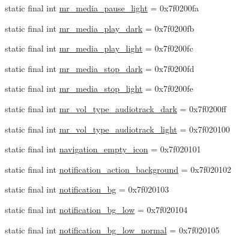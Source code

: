 \begin{CompactItemize}
\item 
static final int \hyperlink{classandroid_1_1support_1_1v7_1_1mediarouter_1_1_r_1_1drawable_a862bad169cc7f219382a1fb810b7ad2}{mr\_\-media\_\-pause\_\-light} = 0x7f0200fa
\item 
static final int \hyperlink{classandroid_1_1support_1_1v7_1_1mediarouter_1_1_r_1_1drawable_e07830f524b3a323dcf5b491b8f82373}{mr\_\-media\_\-play\_\-dark} = 0x7f0200fb
\item 
static final int \hyperlink{classandroid_1_1support_1_1v7_1_1mediarouter_1_1_r_1_1drawable_a74d65532be2843be8daeba8e2464195}{mr\_\-media\_\-play\_\-light} = 0x7f0200fc
\item 
static final int \hyperlink{classandroid_1_1support_1_1v7_1_1mediarouter_1_1_r_1_1drawable_57a217e83adb7064e74ad314307c20f0}{mr\_\-media\_\-stop\_\-dark} = 0x7f0200fd
\item 
static final int \hyperlink{classandroid_1_1support_1_1v7_1_1mediarouter_1_1_r_1_1drawable_2f5a8170570a1387b03bc94129044086}{mr\_\-media\_\-stop\_\-light} = 0x7f0200fe
\item 
static final int \hyperlink{classandroid_1_1support_1_1v7_1_1mediarouter_1_1_r_1_1drawable_5a975d505da767f0098f84cab8593617}{mr\_\-vol\_\-type\_\-audiotrack\_\-dark} = 0x7f0200ff
\item 
static final int \hyperlink{classandroid_1_1support_1_1v7_1_1mediarouter_1_1_r_1_1drawable_8f173785fecbae983c735997d913a81d}{mr\_\-vol\_\-type\_\-audiotrack\_\-light} = 0x7f020100
\item 
static final int \hyperlink{classandroid_1_1support_1_1v7_1_1mediarouter_1_1_r_1_1drawable_df74523f06379081620704be8ff2e49e}{navigation\_\-empty\_\-icon} = 0x7f020101
\item 
static final int \hyperlink{classandroid_1_1support_1_1v7_1_1mediarouter_1_1_r_1_1drawable_f6fa6087d69c1f5320114b93f8387095}{notification\_\-action\_\-background} = 0x7f020102
\item 
static final int \hyperlink{classandroid_1_1support_1_1v7_1_1mediarouter_1_1_r_1_1drawable_152c9eaad30cdd4c19de29d21c54a606}{notification\_\-bg} = 0x7f020103
\item 
static final int \hyperlink{classandroid_1_1support_1_1v7_1_1mediarouter_1_1_r_1_1drawable_27336bc6da0d3c37b7a759f7456dc102}{notification\_\-bg\_\-low} = 0x7f020104
\item 
static final int \hyperlink{classandroid_1_1support_1_1v7_1_1mediarouter_1_1_r_1_1drawable_0f813d27447a7395d240332c0f804b14}{notification\_\-bg\_\-low\_\-normal} = 0x7f020105

\end{CompactItemize}
